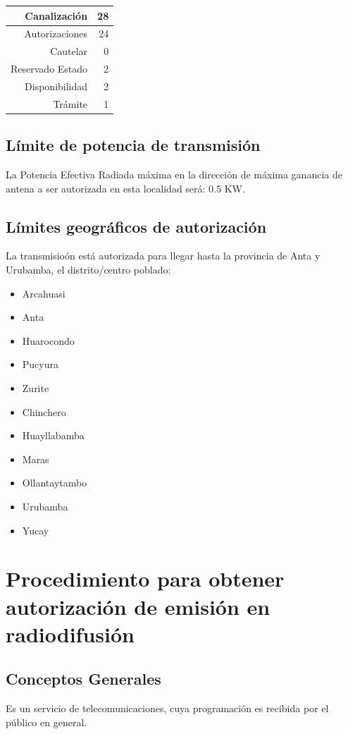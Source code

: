 \documentclass[11pt]{article}
\begin{document}
\begin{tabular}{|r|r|} \hline
	Canalización 			& 28 \\ \hline
	Autorizaciones			& 24 \\ \hline
	Cautelar				& 0 \\ \hline
	Reservado Estado		& 2 \\ \hline
	Disponibilidad			& 2 \\ \hline
	Trámite					& 1 \\ \hline 
\end{tabular}

\subsection{Límite de potencia de transmisión}

La Potencia Efectiva Radiada máxima en la dirección de máxima ganancia de antena a ser autorizada en esta localidad será: 0.5 KW.

\subsection{Límites geográficos de autorización}

La transmisioón está autorizada para llegar hasta la provincia de Anta y Urubamba, el distrito/centro poblado:

\begin{itemize}
	\item Arcahuasi
	\item Anta
	\item Huarocondo
	\item Pucyura
	\item Zurite
	\item Chinchero
	\item Huayllabamba
	\item Maras
	\item Ollantaytambo
	\item Urubamba
	\item Yucay
\end{itemize}


\section{Procedimiento para obtener autorización de emisión en radiodifusión}

\subsection{Conceptos Generales}
Es un servicio de telecomunicaciones, cuya 
programación es recibida por el público en 
general. 
\end{document}
